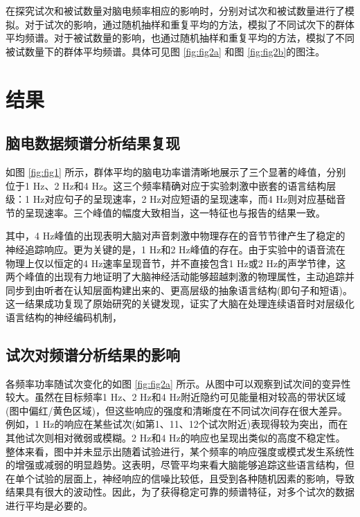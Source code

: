 \documentclass[jou,12pt,floatsintext]{apa7} %
\begin{document}
在探究试次和被试数量对脑电频率相应的影响时，分别对试次和被试数量进行了模拟。对于试次的影响，通过随机抽样和重复平均的方法，模拟了不同试次下的群体平均频谱。对于被试数量的影响，也通过随机抽样和重复平均的方法，模拟了不同被试数量下的群体平均频谱。具体可见图 \ref{fig:fig2a} 和图 \ref{fig:fig2b}的图注。

\section{结果}

\subsection{\heiti 脑电数据频谱分析结果复现}


如图 \ref{fig:fig1} 所示，群体平均的脑电功率谱清晰地展示了三个显著的峰值，分别位于1 Hz、2 Hz和4 Hz。这三个频率精确对应于实验刺激中嵌套的语言结构层级：1 Hz对应句子的呈现速率，2 Hz对应短语的呈现速率，而4 Hz则对应基础音节的呈现速率。三个峰值的幅度大致相当，这一特征也与\textcite{jin2018eye}报告的结果一致。





其中，4 Hz峰值的出现表明大脑对声音刺激中物理存在的音节节律产生了稳定的神经追踪响应。更为关键的是，1 Hz和2 Hz峰值的存在。由于实验中的语音流在物理上仅以恒定的4 Hz速率呈现音节，并不直接包含1 Hz或2 Hz的声学节律，这两个峰值的出现有力地证明了大脑神经活动能够超越刺激的物理属性，主动追踪并同步到由听者在认知层面构建出来的、更高层级的抽象语言结构(即句子和短语)。这一结果成功复现了原始研究的关键发现，证实了大脑在处理连续语音时对层级化语言结构的神经编码机制，

\subsection{\heiti 试次对频谱分析结果的影响}


各频率功率随试次变化的如图 \ref{fig:fig2a} 所示。从图中可以观察到试次间的变异性较大。虽然在目标频率1 Hz、2 Hz和4 Hz附近隐约可见能量相对较高的带状区域(图中偏红/黄色区域)，但这些响应的强度和清晰度在不同试次间存在很大差异。例如，1 Hz的响应在某些试次(如第1、11、12个试次附近)表现得较为突出，而在其他试次则相对微弱或模糊。2 Hz和4 Hz的响应也呈现出类似的高度不稳定性。整体来看，图中并未显示出随着试验进行，某个频率的响应强度或模式发生系统性的增强或减弱的明显趋势。这表明，尽管平均来看大脑能够追踪这些语言结构，但在单个试验的层面上，神经响应的信噪比较低，且受到各种随机因素的影响，导致结果具有很大的波动性。因此，为了获得稳定可靠的频谱特征，对多个试次的数据进行平均是必要的。
\end{document}
